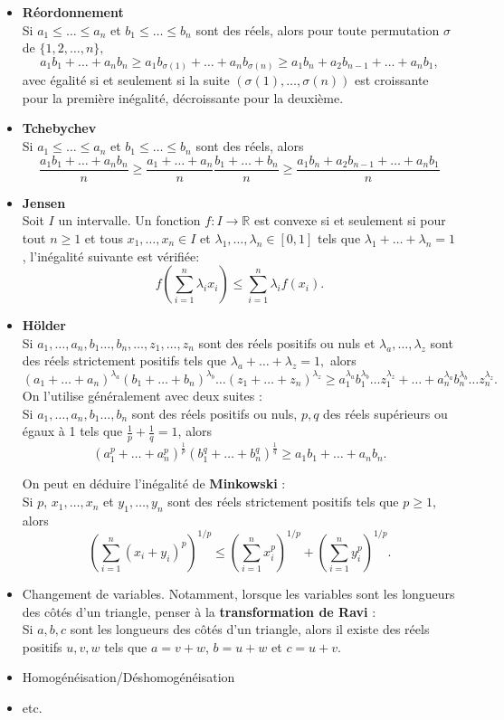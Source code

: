 \documentclass[12pt,A4]{book}
\theoremstyle{definition}
\begin{document}
\begin{itemize}
\item \textbf{Réordonnement}\\
Si $a_1\leq\dots\leq a_n$ et $b_1\leq\dots\leq b_n$ sont des réels, alors pour toute permutation $\sigma$ de $\{1,2,\dots,n\},$
$$a_1b_1+\dots+a_nb_n\geq a_1b_{\sigma(1)}+\dots+a_nb_{\sigma(n)}\geq a_1b_n+a_2b_{n-1}+\dots+a_nb_1,$$
avec égalité si et seulement si la suite $(\sigma(1),\dots,\sigma(n))$ est croissante pour la première inégalité, décroissante pour la deuxième.

\item \textbf{Tchebychev}\\
Si $a_1\leq\dots\leq a_n$ et $b_1\leq\dots\leq b_n$ sont des réels, alors 
\[\frac{a_1b_1+\dots+a_nb_n}{n}\geq \frac{a_1+\dots+a_n}{n}\frac{b_1+\dots+b_n}{n}\geq \frac{a_1b_n+a_2b_{n-1}+\dots+a_nb_1}{n}\]

\item \textbf{Jensen}\\
Soit $I$ un intervalle. Un fonction $f:I\longrightarrow \mathbb{R}$ est convexe si et seulement si pour tout $n\geqslant 1$ et tous $x_1,\dots,x_n\in I$ et $\lambda_1,\dots,\lambda_n\in [0,1]$ tels que $\lambda_1+\dots+\lambda_n=1$, l'inégalité suivante est vérifiée:
\[ f\left( \sum_{i=1}^n\lambda_ix_i \right)\leqslant \sum_{i=1}^n\lambda_if(x_i). \]

\item \textbf{Hölder}\\
Si $a_1,\dots,a_n,b_1\dots,b_n,\dots,z_1,\dots,z_n$ sont des réels positifs ou nuls et $\lambda_a,\dots,\lambda_z$ sont des réels strictement positifs tels que $\lambda_a+\dots+\lambda_z=1,$ alors
$$(a_1+\dots+a_n)^{\lambda_a}(b_1+\dots+b_n)^{\lambda_b}\dots(z_1+\dots+z_n)^{\lambda_z}\geq a_1^{\lambda_a}b_1^{\lambda_b}\dots z_1^{\lambda_z}+\dots+a_n^{\lambda_a}b_n^{\lambda_b}\dots z_n^{\lambda_z}.$$
On l'utilise généralement avec deux suites :\\
Si $a_1,\dots,a_n,b_1\dots,b_n$ sont des réels positifs ou nuls, $p,q$ des réels supérieurs ou égaux à 1 tels que $\frac{1}{p}+\frac{1}{q}=1$, alors
\[ (a_1^p+\dots+ a_n^p)^{\frac{1}{p}}(b_1^q+\dots+ b_n^q)^{\frac{1}{q}}\geq a_1b_1+\dots+ a_nb_n. \]

On peut en déduire l'inégalité de \textbf{Minkowski} :\\
Si $p$, $x_1,\dots, x_n$ et $y_1,\dots, y_n$ sont des r\'eels strictement positifs tels que $p\geqslant1$, alors 
\[ \left(\sum_{i=1}^n(x_i+ y_i)^p\right)^{1/p} \leqslant \left(\sum_{i=1}^nx_i^p\right)^{1/p} + \left(\sum_{i=1}^ny_i^p\right)^{1/p}. \]


\item Changement de variables. Notamment, lorsque les variables sont les longueurs des côtés d'un triangle, penser à la \textbf{transformation de Ravi} :\\
Si $a,b,c$ sont les longueurs des côtés d'un triangle, alors il existe des réels positifs $u,v,w$ tels que $a=v+w$, $b=u+w$ et $c=u+v$.

\item Homogénéisation/Déshomogénéisation
\item etc.
\end{itemize}
\end{document}
